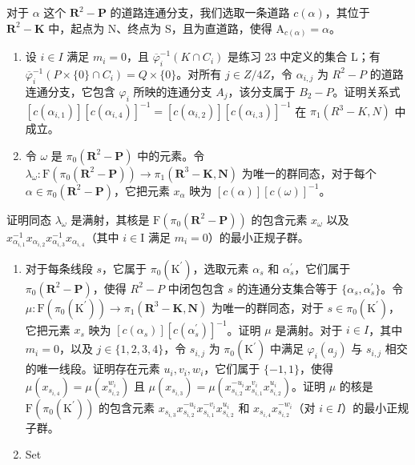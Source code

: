    对于 \(\alpha\) 这个 \(\mathbf{R}^2-\mathbf{P}\) 的道路连通分支，我们选取一条道路 \(c(\alpha)\)，其位于 \(\mathbf{R}^2-\mathbf{K}\) 中，起点为 N、终点为 S，且为直道路，使得 \(\mathrm{A}_{c(\alpha)} = \alpha\)。

\begin{enumerate}
\def\labelenumi{\alph{enumi})}
\setcounter{enumi}{1}
\item
   设 \(i \in I\) 满足 \(m_{i} = 0\)，且 \(\overline{\varphi}_{i}^{-1}(K \cap C_{i})\) 是练习 23 中定义的集合 L；有 \(\overline{\varphi}_{i}^{-1}(P \times \{0\} \cap C_{i}) = Q \times \{0\}\)。对所有 \(j \in Z/4Z\)，令 \(\alpha_{i,j}\) 为 \(R^{2} - P\) 的道路连通分支，它包含 \(\varphi_{i}\) 所映的连通分支 \(A_{j}\)，该分支属于 \(B_{2} - P\)。证明关系式 \([c(\alpha_{i,1})][c(\alpha_{i,4})]^{-1} = [c(\alpha_{i,2})][c(\alpha_{i,3})]^{-1}\) 在 \(\pi_{1}(R^{3} - K, N)\) 中成立。
\item
   令 \(\omega\) 是 \(\pi_0(\mathbf{R}^2-\mathbf{P})\) 中的元素。令 \(\lambda_\omega\colon \mathrm{F}(\pi_0(\mathbf{R}^2-\mathbf{P}))\to \pi_1(\mathbf{R}^3-\mathbf{K},\mathbf{N})\) 为唯一的群同态，对于每个 \(\alpha \in \pi_0(\mathbf{R}^2-\mathbf{P})\)，它把元素 \(x_\alpha\) 映为 \([c(\alpha)][c(\omega)]^{-1}\)。
\end{enumerate}

证明同态 \(\lambda_{\omega}\) 是满射，其核是 \(\mathrm{F}(\pi_0(\mathbf{R}^2 - \mathbf{P}))\) 的包含元素 \(x_{\omega}\) 以及 \(x_{\alpha_{i,1}}^{-1}x_{\alpha_{i,2}}x_{\alpha_{i,3}}^{-1}x_{\alpha_{i,4}}\)（其中 \(i \in \mathrm{I}\) 满足 \(m_i = 0\)）的最小正规子群。

\begin{enumerate}
\def\labelenumi{\alph{enumi})}
\setcounter{enumi}{3}
\item
   对于每条线段 \(s\)，它属于 \(\pi_{0}(\mathrm{K}^{\prime})\)，选取元素 \(\alpha_{s}\) 和 \(\alpha_{s}^{\prime}\)，它们属于 \(\pi_{0}(\mathbf{R}^{2}-\mathbf{P})\)，使得 \(R^{2}-P\) 中闭包包含 \(s\) 的连通分支集合等于 \(\{\alpha_{s},\alpha_{s}^{\prime}\}\)。令 \(\mu\colon\mathrm{F}(\pi_{0}(\mathrm{K}^{\prime}))\to\pi_{1}(\mathbf{R}^{3}-\mathbf{K},\mathbf{N})\) 为唯一的群同态，对于 \(s\in\pi_{0}(\mathrm{K}^{\prime})\)，它把元素 \(x_{s}\) 映为 \([c(\alpha_{s})][c(\alpha_{s}^{\prime})]^{-1}\)。证明 \(\mu\) 是满射。对于 \(i\in I\)，其中 \(m_{i}=0\)，以及 \(j\in\{1,2,3,4\}\)，令 \(s_{i,j}\) 为 \(\pi_{0}(\mathrm{K}^{\prime})\) 中满足 \(\varphi_{i}(a_{j})\) 与 \(s_{i,j}\) 相交的唯一线段。证明存在元素 \(u_{i},v_{i},w_{i}\)，它们属于 \(\{-1,1\}\)，使得 \(\mu(x_{s_{i,4}})=\mu(x_{s_{i,2}}^{w_{i}})\) 且 \(\mu(x_{s_{i,3}})=\mu(x_{s_{i,2}}^{-u_{i}}x_{s_{i,1}}^{v_{i}}x_{s_{i,2}}^{u_{i}})\)。证明 \(\mu\) 的核是 \(\mathrm{F}(\pi_{0}(\mathrm{K}^{\prime}))\) 的包含元素 \(x_{s_{i,3}}x_{s_{i,2}}^{-u_{i}}x_{s_{i,1}}^{-v_{i}}x_{s_{i,2}}^{u_{i}}\) 和 \(x_{s_{i,4}}x_{s_{i,2}}^{-w_{i}}\)（对 \(i\in I\)）的最小正规子群。
\item
  Set
\end{enumerate}

